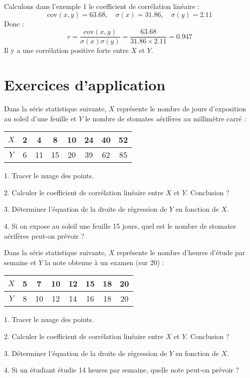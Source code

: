 \documentclass[11pt]{article}
\begin{document}
\begin{exemple}
Calculons dans l'exemple 1 le coefficient de corrélation linéaire :
\[
\text{cov}(x, y) = 63.68, \quad \sigma(x) = 31.86, \quad \sigma(y) = 2.11
\]
Donc :
\[
r = \frac{\text{cov}(x, y)}{\sigma(x) \sigma(y)} = \frac{63.68}{31.86 \times 2.11} = 0.947
\]
Il y a une corrélation positive forte entre \( X \) et \( Y \).
\end{exemple}

\section{Exercices d'application}

\begin{exercice}
Dans la série statistique suivante, \( X \) représente le nombre de
jours d’exposition au soleil d’une feuille et \( Y \) le nombre de
stomates aérifères au millimètre carré :

\begin{center}
\begin{tabular}{|c|c|c|c|c|c|c|c|}
\hline
\( X \) & 2 & 4 & 8 & 10 & 24 & 40 & 52 \\
\hline
\( Y \) & 6 & 11 & 15 & 20 & 39 & 62 & 85 \\
\hline
\end{tabular}
\end{center}

1. Tracer le nuage des points.

2. Calculer le coefficient de corrélation linéaire entre \( X \) et \( Y \). Conclusion ?

3. Déterminer l’équation de la droite de régression de \( Y \) en fonction de \( X \).

4. Si on expose au soleil une feuille 15 jours, quel est le nombre de stomates aérifères peut-on prévoir ?
\end{exercice}

\begin{exercice}
Dans la série statistique suivante, \( X \) représente le nombre
d’heures d’étude par semaine et \( Y \) la note obtenue à un examen
(sur 20) :

\begin{center}
\begin{tabular}{|c|c|c|c|c|c|c|c|}
\hline
\( X \) & 5 & 7 & 10 & 12 & 15 & 18 & 20 \\
\hline
\( Y \) & 8 & 10 & 12 & 14 & 16 & 18 & 20 \\
\hline
\end{tabular}
\end{center}

1. Tracer le nuage des points.

2. Calculer le coefficient de corrélation linéaire entre \( X \) et \( Y \). Conclusion ?

3. Déterminer l’équation de la droite de régression de \( Y \) en fonction de \( X \).

4. Si un étudiant étudie 14 heures par semaine, quelle note peut-on prévoir ?
\end{exercice}
\end{document}
